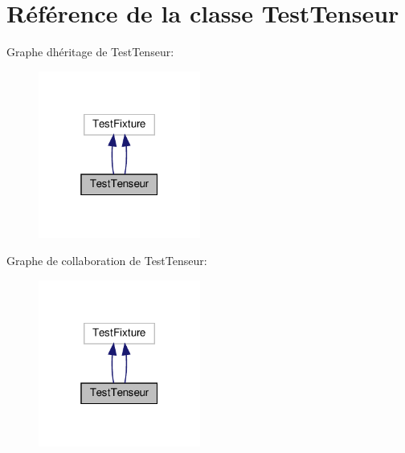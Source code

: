 \hypertarget{class_test_tenseur}{}\section{Référence de la classe Test\+Tenseur}
\label{class_test_tenseur}


Graphe d\textquotesingle{}héritage de Test\+Tenseur\+:\nopagebreak
\begin{figure}[H]
\begin{center}
\leavevmode
\includegraphics[width=151pt]{class_test_tenseur__inherit__graph}
\end{center}
\end{figure}


Graphe de collaboration de Test\+Tenseur\+:\nopagebreak
\begin{figure}[H]
\begin{center}
\leavevmode
\includegraphics[width=151pt]{class_test_tenseur__coll__graph}
\end{center}
\end{figure}
